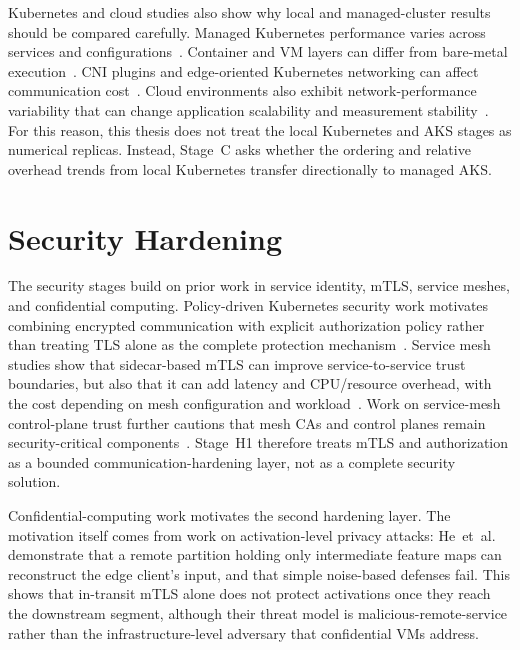 Kubernetes and cloud studies also show why local and managed-cluster results should be
compared carefully. Managed Kubernetes performance varies across services and
configurations~\cite{managed_k8s_perf}. Container and VM layers can differ from
bare-metal execution~\cite{virtualization_costs}. CNI plugins and edge-oriented
Kubernetes networking can affect communication cost~\cite{cni_k8s_ic2e21}. Cloud
environments also exhibit network-performance variability that can change application
scalability and measurement stability~\cite{noise_in_clouds}. For this reason, this
thesis does not treat the local Kubernetes and AKS stages as numerical replicas.
Instead, Stage~C asks whether the ordering and relative overhead trends from local
Kubernetes transfer directionally to managed AKS.

\section{Security Hardening}
\label{sec:rw-security}

The security stages build on prior work in service identity, mTLS, service meshes, and
confidential computing. Policy-driven Kubernetes security work motivates combining
encrypted communication with explicit authorization policy rather than treating TLS
alone as the complete protection mechanism~\cite{ashraf2025policy_workflow}. Service
mesh studies show that sidecar-based mTLS can improve service-to-service trust
boundaries, but also that it can add latency and CPU/resource overhead, with the
cost depending on mesh configuration and workload~\cite{meshinsight_socc23,bremlerbarr2025mtls}.
Work on service-mesh control-plane
trust further cautions that mesh CAs and control planes remain security-critical
components~\cite{poudel2025mazu}. Stage~H1 therefore treats mTLS and authorization as a
bounded communication-hardening layer, not as a complete security solution.

Confidential-computing work motivates the second hardening layer. The motivation
itself comes from work on activation-level privacy attacks:
He~et~al.~\cite{he2021_attacking_collaborative} demonstrate that a remote partition
holding only intermediate feature maps can reconstruct the edge client's input, and
that simple noise-based defenses fail. This shows that in-transit mTLS alone does
not protect activations once they reach the downstream segment, although their
threat model is malicious-remote-service rather than the infrastructure-level
adversary that confidential VMs address.

